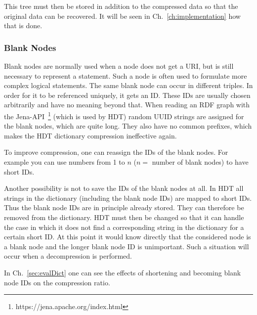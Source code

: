 This tree must then be stored in addition to the compressed data so that the original data can be recovered. It will be seen in Ch.~\ref{ch:implementation} how that is done.

\subsubsection{Blank Nodes}\label{sec:approachBlankNodes}

Blank nodes are normally used when a node does not get a URI, but is still necessary to represent a statement. Such a node is often used to formulate more complex logical statements. The same blank node can occur in different triples. In order for it to be referenced uniquely, it gets an ID. These IDs are usually chosen arbitrarily and have no meaning beyond that. When reading an RDF graph with the Jena-API~\footnote{\label{foot:5}https://jena.apache.org/index.html} (which is used by HDT) random UUID strings are assigned for the blank nodes, which are quite long. They also have no common prefixes, which makes the HDT dictionary compression ineffective again. 

To improve compression, one can reassign the IDs of the blank nodes. For example you can use numbers from 1 to $n$ ($n=$ number of blank nodes) to have short IDs. 

Another possibility is not to save the IDs of the blank nodes at all. In HDT all strings in the dictionary (including the blank node IDs) are mapped to short IDs. Thus the blank node IDs are in principle already stored. They can therefore be removed from the dictionary. HDT must then be changed so that it can handle the case in which it does not find a corresponding string in the dictionary for a certain short ID. At this point it would know directly that the considered node is a blank node and the longer blank node ID is unimportant. Such a situation will occur when a decompression is performed.

In Ch.~\ref{sec:evalDict} one can see the effects of shortening and becoming blank node IDs on the compression ratio.















